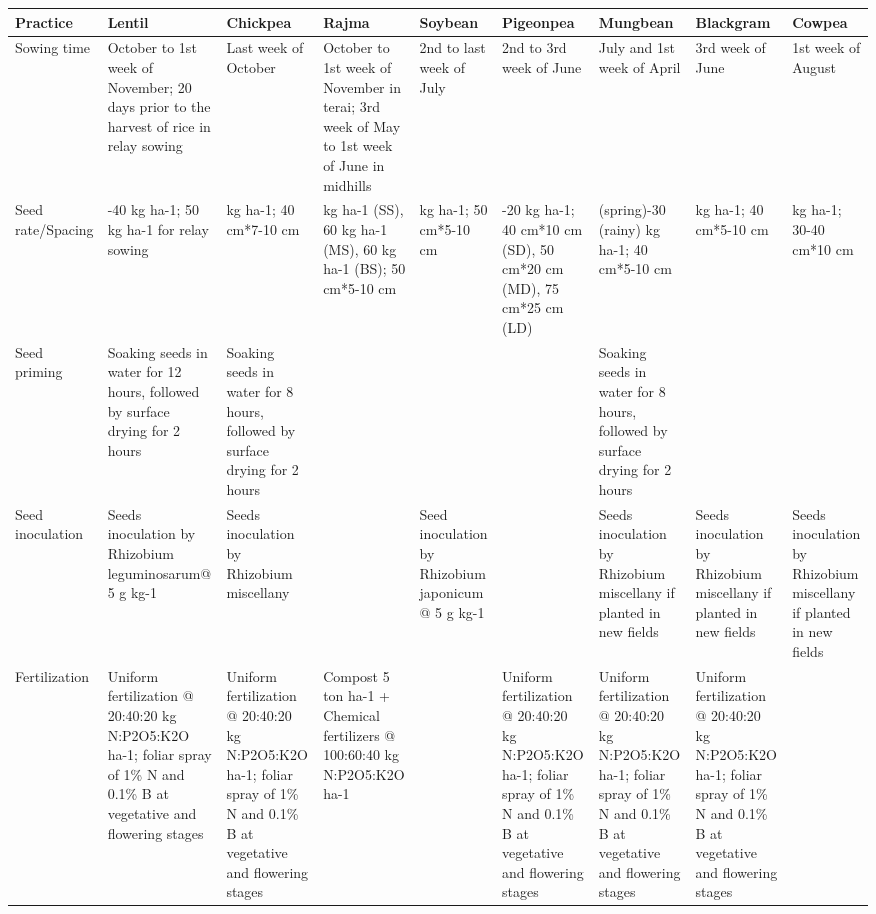 \documentclass[
  openany]{book}
\begin{document}
\begin{landscape}\begingroup\fontsize{6}{8}\selectfont

\begin{longtable}{>{\raggedright\arraybackslash}p{10em}>{\raggedright\arraybackslash}p{12em}>{\raggedright\arraybackslash}p{12em}>{\raggedright\arraybackslash}p{12em}>{\raggedright\arraybackslash}p{12em}>{\raggedright\arraybackslash}p{12em}>{\raggedright\arraybackslash}p{12em}>{\raggedright\arraybackslash}p{12em}>{\raggedright\arraybackslash}p{12em}}
\toprule
Practice & Lentil & Chickpea & Rajma & Soybean & Pigeonpea & Mungbean & Blackgram & Cowpea\\
\midrule
\rowcolor{gray!6}  Sowing time & October to 1st week of November; 20 days prior to the harvest of rice in relay sowing & Last week of October & October to 1st week of November in terai; 3rd week of May to 1st week of June in midhills & 2nd to last week of July & 2nd to 3rd  week of June & July and 1st week of April & 3rd week of June & 1st week of August\\
Seed rate/Spacing & 30-40 kg ha-1; 50 kg ha-1 for relay sowing & 60 kg ha-1; 40 cm*7-10 cm & 60 kg ha-1 (SS), 60 kg ha-1 (MS), 60 kg ha-1 (BS); 50 cm*5-10 cm & 60 kg ha-1; 50 cm*5-10 cm & 15-20 kg ha-1; 40 cm*10 cm (SD), 50 cm*20 cm (MD), 75 cm*25 cm (LD) & 25 (spring)-30 (rainy) kg ha-1; 40 cm*5-10 cm & 30 kg ha-1; 40 cm*5-10 cm & 60 kg ha-1; 30-40 cm*10 cm\\
\rowcolor{gray!6}  Seed priming & Soaking seeds in water for 12 hours, followed by surface drying for 2 hours & Soaking seeds in water for 8 hours, followed by surface drying for 2 hours &  &  &  & Soaking seeds in water for 8 hours, followed by surface drying for 2 hours &  & \\
Seed inoculation & Seeds inoculation by Rhizobium leguminosarum@ 5 g kg-1 & Seeds inoculation by Rhizobium miscellany &  & Seed inoculation by Rhizobium japonicum @ 5 g kg-1 &  & Seeds inoculation by Rhizobium miscellany if planted in new fields & Seeds inoculation by Rhizobium miscellany if planted in new fields & Seeds inoculation by Rhizobium miscellany if planted in new fields\\
\rowcolor{gray!6}  Fertilization & Uniform fertilization @ 20:40:20 kg N:P2O5:K2O ha-1; foliar spray of 1\% N and 0.1\% B at vegetative and flowering stages & Uniform fertilization @ 20:40:20 kg N:P2O5:K2O ha-1; foliar spray of 1\% N and 0.1\% B at vegetative and flowering stages & Compost 5 ton ha-1 + Chemical fertilizers @ 100:60:40 kg N:P2O5:K2O ha-1 &  & Uniform fertilization @ 20:40:20 kg N:P2O5:K2O ha-1; foliar spray of 1\% N and 0.1\% B at vegetative and flowering stages & Uniform fertilization @ 20:40:20 kg N:P2O5:K2O ha-1; foliar spray of 1\% N and 0.1\% B at vegetative and flowering stages & Uniform fertilization @ 20:40:20 kg N:P2O5:K2O ha-1; foliar spray of 1\% N and 0.1\% B at vegetative and flowering stages & \\

\end{longtable}
\end{landscape}
\end{document}
